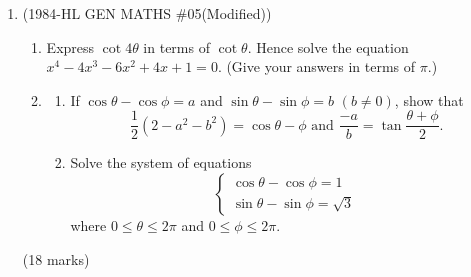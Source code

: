 \documentclass[12pt]{article}
\begin{document}
\begin{enumerate}
        \pagebreak
        \item (1984-HL GEN MATHS \#05(Modified)) \begin{enumerate}
            \item Express $\cot{4\theta}$ in terms of $\cot{\theta}$. Hence solve the equation $x^4-4x^3-6x^2+4x+1=0$. (Give your answers in terms of $\pi$.)
            \item \begin{enumerate}
                \item If $\cos{\theta}-\cos{\phi}=a$ and $\sin{\theta}-\sin{\phi}=b$ $(b\neq 0)$, show that $$\frac{1}{2}(2-a^2-b^2)=\cos{\theta-\phi}\textrm{ and }\frac{-a}{b}=\tan{\frac{\theta+\phi}{2}}.$$
                \item Solve the system of equations $$\begin{cases}
                    \cos{\theta}-\cos{\phi}=1\\
                    \sin{\theta}-\sin{\phi}=\sqrt{3}
                \end{cases}$$
                where $0\leq \theta \leq 2\pi$ and $0\leq \phi \leq 2\pi$.
            \end{enumerate}
        \end{enumerate}\hfill(18 marks)

        \hrulefill
            
            \hrulefill
            
            \hrulefill
            
            \hrulefill
            
            \hrulefill
            
            \hrulefill
            
            \hrulefill
            
            \hrulefill
            
            \hrulefill
            
            \hrulefill
            
            \hrulefill
            
            \hrulefill
            
            \hrulefill
            
            \hrulefill
            
            \hrulefill
            
            \hrulefill
            
            \hrulefill
            

\end{enumerate}
\end{document}
